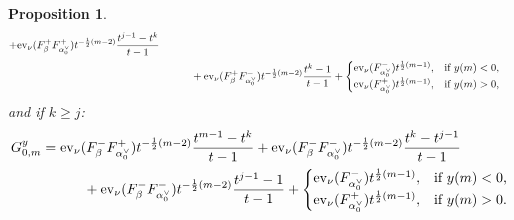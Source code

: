 \documentclass[11pt]{article}
\theoremstyle{plain}
\newtheorem{prop}[thm]{Proposition}
\theoremstyle{definition}
\theoremstyle{remark}
\numberwithin{equation}{section}
\def\ev{\mathrm{ev}}
\newcounter{r}
\newcounter{s}
\begin{document}
\begin{prop}
\begin{align*}
+
\ev_\nu(F^+_\beta F^+_{\alpha^\vee_0}) t^{-\frac{1}{2}(m-2)} \frac{t^{j-1} - t^{k}}{t-1} \\
&\qquad\quad 
+
\ev_\nu(F^+_\beta F^-_{\alpha^\vee_0})
t^{-\frac{1}{2}(m-2)} \frac{t^{k} - 1}{t-1}
+
\begin{cases}
\ev_\nu(F^-_{\alpha^\vee_0})t^{\frac12(m-1)}, &\hbox{if $y(m)<0$,} \\
\ev_\nu(F^+_{\alpha^\vee_0})t^{\frac12(m-1)}, &\hbox{if $y(m)>0$,} 
\end{cases}
\end{align*}
and if $k \ge j$:
\begin{align*}
G_{0,m}^y 
&= \ev_\nu(F^-_\beta F^+_{\alpha^\vee_0}) t^{-\frac{1}{2}(m-2)} \frac{t^{m-1} - t^{k}}{t-1}
+
\ev_\nu(F^-_\beta F^-_{\alpha^\vee_0}) t^{-\frac{1}{2}(m-2)} \frac{t^{k} - t^{j-1}}{t-1} \\
&\qquad\quad 
+
\ev_\nu(F^-_\beta F^-_{\alpha^\vee_0})
t^{-\frac{1}{2}(m-2)} \frac{t^{j-1} - 1}{t-1}
+
\begin{cases}
\ev_\nu(F^-_{\alpha^\vee_0})t^{\frac12(m-1)}, &\hbox{if $y(m)<0$,} \\
\ev_\nu(F^+_{\alpha^\vee_0})t^{\frac12(m-1)}, &\hbox{if $y(m)>0$.} 
\end{cases}
\end{align*}
\end{prop}
\end{document}

